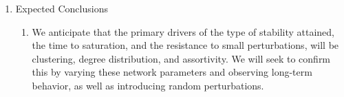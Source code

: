 \documentclass{article}
\begin{document}
\begin{enumerate}[label=\arabic*.]
    \item Expected Conclusions
    
        \begin{enumerate}[label=\Alph*.]
        \item We anticipate that the primary drivers of the type of stability attained, the time to saturation, and the resistance to small perturbations, will be clustering, degree distribution, and assortivity. We will seek to confirm this by varying these network parameters and observing long-term behavior, as well as introducing random perturbations. 
        \end{enumerate}

\end{enumerate}




\end{document}
